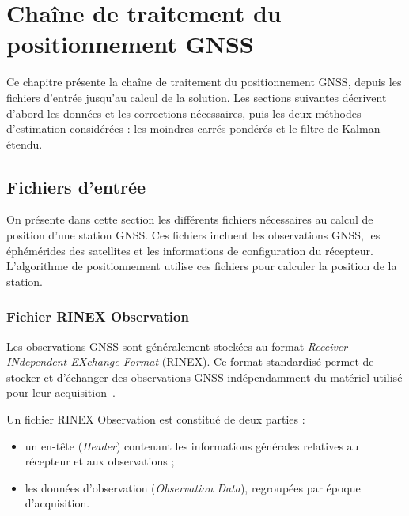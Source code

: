 
\chapter{Chaîne de traitement du positionnement GNSS}
\label{chaine_traitement_positionnement_gnss}

Ce chapitre présente la chaîne de traitement du positionnement GNSS, depuis
les fichiers d'entrée jusqu'au calcul de la solution. Les sections suivantes décrivent
d'abord les données et les corrections nécessaires, puis les deux méthodes
d'estimation considérées : les moindres carrés pondérés et le filtre de Kalman
étendu.

\section{Fichiers d'entrée}

On présente dans cette section les différents fichiers nécessaires au calcul de position d'une station GNSS. Ces fichiers incluent les observations GNSS, les éphémérides des satellites et les informations de configuration du récepteur.
L'algorithme de positionnement utilise ces fichiers pour calculer la position de la station.


    \subsection{Fichier RINEX Observation}

    Les observations GNSS sont généralement stockées au format \textit{Receiver INdependent EXchange Format} (RINEX). Ce format standardisé permet de stocker et d'échanger des observations GNSS indépendamment du matériel utilisé pour leur acquisition~\cite{rinex304}.

Un fichier RINEX Observation est constitué de deux parties :

\begin{itemize}
    \item un en-tête (\textit{Header}) contenant les informations générales relatives au récepteur et aux observations ;
    \item les données d'observation (\textit{Observation Data}), regroupées par époque d'acquisition.
\end{itemize}

